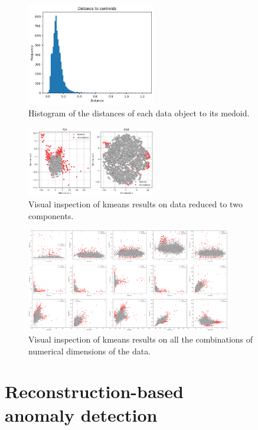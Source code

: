 \documentclass[9pt,twocolumn]{article}
\begin{document}
\begin{figure}[h]
    \centering
    \includegraphics[width=0.5\textwidth]{images/KM_disthist.png}
    \caption{Histogram of the distances of each data object to its medoid.}
    \label{fig:kmeans-dist-hist}
\end{figure}

\begin{figure}[h]
    \centering
    \includegraphics[width=0.5\textwidth]{images/KM_PCATSNE.png}
    \caption{Visual inspection of kmeans results on data reduced to two components.}
    \label{fig:kmeans_pcatsne}
\end{figure}

\begin{figure}[h]
    \centering
    \includegraphics[width=0.80\textwidth]{images/KM_floatdims.png}
    \caption{Visual inspection of kmeans results on all the combinations of numerical dimensions of the data.}
    \label{fig:kmeans_floatdims}
\end{figure}


\section{Reconstruction-based\\ anomaly detection}
\end{document}
